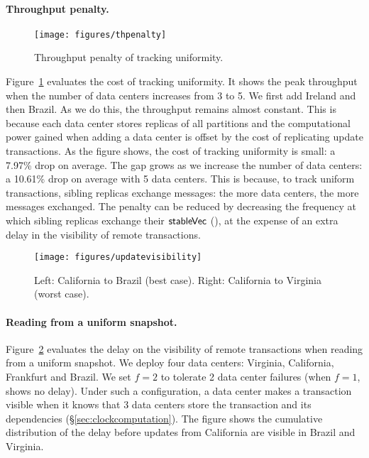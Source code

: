 \paragraph{Throughput penalty.}

\begin{figure}[t]
\texttt{[image: figures/thpenalty]}
\caption{Throughput penalty of tracking uniformity.}
\label{fig:thpenalty}
\end{figure}

Figure~\ref{fig:thpenalty} evaluates the cost of tracking
uniformity. It shows the peak throughput when the number of data centers increases from 3 to
5. We first add Ireland and then Brazil. As we do this, the throughput
remains almost constant. This is because each
data center stores replicas of all partitions and the
computational power gained when adding a data center is 
offset by the cost of replicating update transactions. As the
figure shows, the cost of tracking 
uniformity is small: a 7.97\% drop on average. The gap grows as we
increase the number of data centers: a 10.61\% drop on average with 5
data centers.
This is because, to track uniform transactions, sibling replicas exchange
messages: the more data centers, the more messages exchanged.
The penalty can be 
reduced by decreasing the frequency at which sibling replicas
exchange their ${\sf stableVec}$
(), at the expense of an extra delay
in the visibility of remote transactions. 



\begin{figure}[t]
\texttt{[image: figures/updatevisibility]}
\caption{Left: California to Brazil (best case). Right: California to
  Virginia (worst case).}
\label{fig:visibility}
\end{figure}

\paragraph{Reading from a uniform snapshot.}

Figure~\ref{fig:visibility} evaluates the delay on the visibility
of remote transactions when reading from a uniform
snapshot. We deploy four data centers: Virginia,
California, Frankfurt and Brazil. We set $f=2$ to tolerate 2 data
center failures (when $f=1$, \Uniform shows no delay). Under such a configuration, a data
center makes a transaction visible when it knows that
3 data centers store the transaction and its dependencies
(\S\ref{sec:clockcomputation}). The figure shows
the cumulative distribution of the delay before updates
from California are visible in Brazil
and Virginia. 

